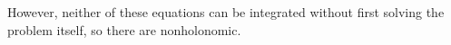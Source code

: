 \documentclass[a4paper,12pt]{report}
\begin{document}
However, neither of these equations can be integrated without first solving the problem itself, so there are nonholonomic.
\end{document}
